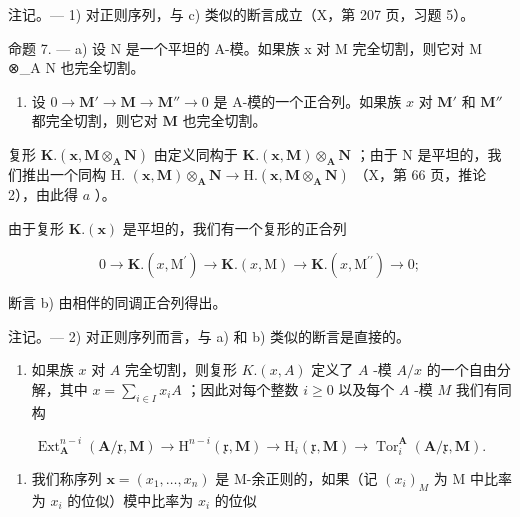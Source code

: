 注记。--- 1) 对正则序列，与 c) 类似的断言成立（X，第 207 页，习题 5）。

命题 7. --- a) 设 N 是一个平坦的 A-模。如果族 x 对 M 完全切割，则它对 M ⊗\_A N 也完全切割。

\begin{enumerate}
\def\labelenumi{\alph{enumi})}
\setcounter{enumi}{1}
\tightlist
\item
  设 \(0 \to \mathbf{M}' \to \mathbf{M} \to \mathbf{M}'' \to 0\) 是 A-模的一个正合列。如果族 \(x\) 对 \(\mathbf{M}'\) 和 \(\mathbf{M}''\) 都完全切割，则它对 \(\mathbf{M}\) 也完全切割。
\end{enumerate}

复形 \(\mathbf{K}.\left(\mathbf{x},\mathbf{M}\otimes_{\mathbf{A}}\mathbf{N}\right)\) 由定义同构于 \(\mathbf{K}.\left(\mathbf{x},\mathbf{M}\right)\otimes_{\mathbf{A}}\mathbf{N}\) ；由于 N 是平坦的，我们推出一个同构 H. \((\mathbf{x},\mathbf{M})\otimes_{\mathbf{A}}\mathbf{N}\to\mathrm{H}.\left(\mathbf{x},\mathbf{M}\otimes_{\mathbf{A}}\mathbf{N}\right)\) （X，第 66 页，推论 2），由此得 \(a\) ）。

由于复形 \(\mathbf{K}.\left(\mathbf{x}\right)\) 是平坦的，我们有一个复形的正合列

\[
0 \rightarrow \mathbf {K}. (x, \mathrm{M} ^ {\prime}) \rightarrow \mathbf {K}. (x, \mathrm{M}) \rightarrow \mathbf {K}. (x, \mathrm{M} ^ {\prime \prime}) \rightarrow 0;
\]

断言 b) 由相伴的同调正合列得出。

注记。--- 2) 对正则序列而言，与 a) 和 b) 类似的断言是直接的。

\begin{enumerate}
\def\labelenumi{\arabic{enumi})}
\setcounter{enumi}{2}
\tightlist
\item
  如果族 \(x\) 对 \(A\) 完全切割，则复形 \(K.(x, A)\) 定义了 \(A\) -模 \(A/x\) 的一个自由分解，其中 \(x = \sum_{i \in I} x_i A\) ；因此对每个整数 \(i \geqslant 0\) 以及每个 \(A\) -模 \(M\) 我们有同构
\end{enumerate}

\[
\operatorname{Ext} _ {\mathbf {A}} ^ {n - i} (\mathbf {A} / \mathfrak {x}, \mathbf {M}) \rightarrow \mathrm{H} ^ {n - i} (\mathfrak {x}, \mathbf {M}) \rightarrow \mathrm{H} _ {i} (\mathfrak {x}, \mathbf {M}) \rightarrow \operatorname{Tor} _ {i} ^ {\mathbf {A}} (\mathbf {A} / \mathfrak {x}, \mathbf {M}).\tag{15}
\]

\begin{enumerate}
\def\labelenumi{\arabic{enumi})}
\setcounter{enumi}{3}
\tightlist
\item
  我们称序列 \(\boldsymbol{x} = (x_1, \dots, x_n)\) 是 M-余正则的，如果（记 \((x_i)_M\) 为 M 中比率为 \(x_i\) 的位似）模中比率为 \(x_i\) 的位似
\end{enumerate}

